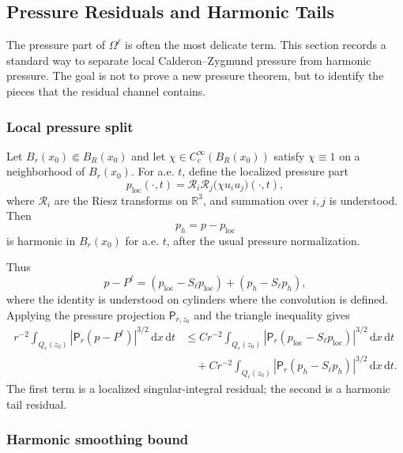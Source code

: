 \documentclass[11pt]{article}
\numberwithin{equation}{section}
\newcommand{\R}{\mathbb R}
\newcommand{\loc}{\mathrm{loc}}
\newcommand{\dxdt}{\,\mathrm dx\,\mathrm dt}
\newcommand{\Pf}{\mathsf P}
\begin{document}
\subsection{Pressure Residuals and Harmonic Tails}\label{sec:pressure-residuals}

The pressure part of $\Omega^\ell$ is often the most delicate term.  This section records a standard way to separate local Calderon--Zygmund pressure from harmonic pressure.  The goal is not to prove a new pressure theorem, but to identify the pieces that the residual channel contains.

\subsubsection{Local pressure split}

Let $B_r(x_0)\Subset B_R(x_0)$ and let $\chi\in C_c^\infty(B_R(x_0))$ satisfy $\chi\equiv1$ on a neighborhood of $B_r(x_0)$.  For a.e. $t$, define the localized pressure part
\begin{equation}\label{eq:localized-pressure-part}
p_{\loc}(\cdot,t)=\mathcal R_i\mathcal R_j\bigl(\chi u_i u_j\bigr)(\cdot,t),
\end{equation}
where $\mathcal R_i$ are the Riesz transforms on $\R^3$, and summation over $i,j$ is understood.  Then
\[
p_h=p-p_{\loc}
\]
is harmonic in $B_r(x_0)$ for a.e. $t$, after the usual pressure normalization.

Thus
\begin{equation}\label{eq:pressure-residual-split}
p-P^\ell
=(p_{\loc}-S_\ell p_{\loc})+(p_h-S_\ell p_h),
\end{equation}
where the identity is understood on cylinders where the convolution is defined.  Applying the pressure projection $\Pf_{r,z_0}$ and the triangle inequality gives
\begin{align}\label{eq:pressure-residual-local-harmonic}
r^{-2}\int_{Q_r(z_0)}|\Pf_r(p-P^\ell)|^{3/2}\dxdt
&\le
C r^{-2}\int_{Q_r(z_0)}|\Pf_r(p_{\loc}-S_\ell p_{\loc})|^{3/2}\dxdt
\nonumber\\
&\quad+
C r^{-2}\int_{Q_r(z_0)}|\Pf_r(p_h-S_\ell p_h)|^{3/2}\dxdt.
\end{align}
The first term is a localized singular-integral residual; the second is a harmonic tail residual.

\subsubsection{Harmonic smoothing bound}
\end{document}
